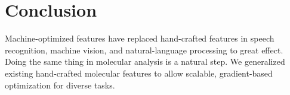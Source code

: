 \documentclass{article}
\begin{document}






\section{Conclusion}
Machine-optimized features have replaced hand-crafted features in speech recognition, machine vision, and natural-language processing to great effect.
Doing the same thing in molecular analysis is a natural step.
We generalized existing hand-crafted molecular features to allow scalable, gradient-based optimization for diverse tasks.



\end{document}
